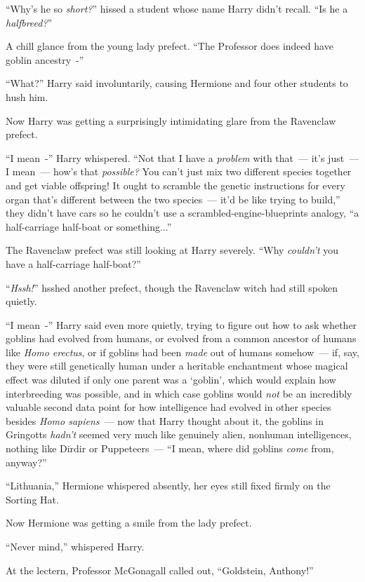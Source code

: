 ``Why's he so \emph{short?}'' hissed a student whose name Harry didn't recall. ``Is he a \emph{halfbreed?}''

A chill glance from the young lady prefect. ``The Professor does indeed have goblin ancestry~-''

``What?'' Harry said involuntarily, causing Hermione and four other students to hush him.

Now Harry was getting a surprisingly intimidating glare from the Ravenclaw prefect.

``I mean~-'' Harry whispered. ``Not that I have a \emph{problem} with that~--- it's just~--- I mean~--- how's that \emph{possible?} You can't just mix two different species together and get viable offspring! It ought to scramble the genetic instructions for every organ that's different between the two species~--- it'd be like trying to build,'' they didn't have cars so he couldn't use a scrambled-engine-blueprints analogy, ``a half-carriage half-boat or something...''

The Ravenclaw prefect was still looking at Harry severely. ``Why \emph{couldn't} you have a half-carriage half-boat?''

``\emph{Hssh!}'' hsshed another prefect, though the Ravenclaw witch had still spoken quietly.

``I mean~-'' Harry said even more quietly, trying to figure out how to ask whether goblins had evolved from humans, or evolved from a common ancestor of humans like \emph{Homo erectus}, or if goblins had been \emph{made} out of humans somehow~--- if, say, they were still genetically human under a heritable enchantment whose magical effect was diluted if only one parent was a `goblin', which would explain how interbreeding was possible, and in which case goblins would \emph{not} be an incredibly valuable second data point for how intelligence had evolved in other species besides \emph{Homo sapiens}~--- now that Harry thought about it, the goblins in Gringotts \emph{hadn't} seemed very much like genuinely alien, nonhuman intelligences, nothing like Dirdir or Puppeteers~--- ``I mean, where did goblins \emph{come} from, anyway?''

``Lithuania,'' Hermione whispered absently, her eyes still fixed firmly on the Sorting Hat.

Now Hermione was getting a smile from the lady prefect.

``Never mind,'' whispered Harry.

At the lectern, Professor McGonagall called out, ``Goldstein, Anthony!''


